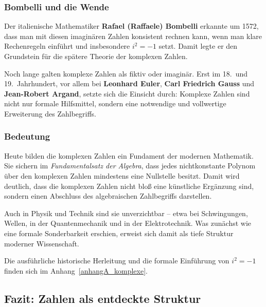 \subsubsection*{Bombelli und die Wende}
Der italienische Mathematiker \textbf{Rafael (Raffaele) Bombelli}
erkannte um 1572,
dass man mit diesen \glqq imaginären Zahlen\grqq{} konsistent rechnen kann,
wenn man klare Rechenregeln einführt und insbesondere $i^2=-1$ setzt.
Damit legte er den Grundstein
für die spätere Theorie der komplexen Zahlen.

Noch lange galten komplexe Zahlen als \glqq fiktiv\grqq{} oder \glqq imaginär\grqq.
Erst im 18.~und 19.~Jahrhundert,
vor allem bei \textbf{Leonhard Euler},
\textbf{Carl Friedrich Gauss}
und \textbf{Jean-Robert Argand},
setzte sich die Einsicht durch:
Komplexe Zahlen sind nicht nur formale Hilfsmittel,
sondern eine notwendige und vollwertige Erweiterung des Zahlbegriffs.

\subsubsection*{Bedeutung}
Heute bilden die komplexen Zahlen ein Fundament der modernen Mathematik.
Sie sichern im \emph{Fundamentalsatz der Algebra},
dass jedes nichtkonstante Polynom über den komplexen Zahlen
mindestens eine Nullstelle besitzt.
Damit wird deutlich,
dass die komplexen Zahlen nicht bloß eine künstliche Ergänzung sind,
sondern einen Abschluss des algebraischen Zahlbegriffs darstellen.

Auch in Physik und Technik sind sie unverzichtbar --
etwa bei Schwingungen, Wellen,
in der Quantenmechanik
und in der Elektrotechnik.
Was zunächst wie eine formale Sonderbarkeit erschien,
erweist sich damit als tiefe Struktur moderner Wissenschaft.

Die ausführliche historische Herleitung
und die formale Einführung von $i^2=-1$
finden sich im Anhang~\ref{anhangA_komplexe}.


\subsection{Fazit: Zahlen als entdeckte Struktur}

